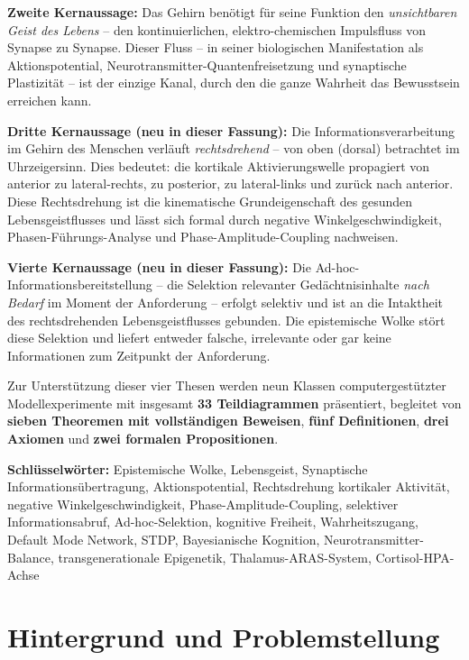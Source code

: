 ﻿\documentclass[12pt,a4paper]{report}
\theoremstyle{plain}
\theoremstyle{definition}
\theoremstyle{remark}
\begin{document}
	\textbf{Zweite Kernaussage:} Das Gehirn benötigt für seine Funktion
	den \emph{unsichtbaren Geist des Lebens} -- den kontinuierlichen, elektro-chemischen
	Impulsfluss von Synapse zu Synapse. Dieser Fluss -- in seiner biologischen
	Manifestation als Aktionspotential, Neurotransmitter-Quantenfreisetzung und
	synaptische Plastizität -- ist der einzige Kanal, durch den die ganze
	Wahrheit das Bewusstsein erreichen kann.
	
	\textbf{Dritte Kernaussage (neu in dieser Fassung):} Die Informationsverarbeitung
	im Gehirn des Menschen verläuft \emph{rechtsdrehend} -- von oben (dorsal)
	betrachtet im Uhrzeigersinn. Dies bedeutet: die kortikale Aktivierungswelle
	propagiert von anterior zu lateral-rechts, zu posterior, zu lateral-links
	und zurück nach anterior. Diese Rechtsdrehung ist die kinematische
	Grundeigenschaft des gesunden Lebensgeistflusses und lässt sich formal
	durch negative Winkelgeschwindigkeit, Phasen-Führungs-Analyse und
	Phase-Amplitude-Coupling nachweisen.
	
	\textbf{Vierte Kernaussage (neu in dieser Fassung):} Die
	Ad-hoc-Informationsbereitstellung -- die Selektion relevanter Gedächtnisinhalte
	\emph{nach Bedarf} im Moment der Anforderung -- erfolgt selektiv und ist
	an die Intaktheit des rechtsdrehenden Lebensgeistflusses gebunden. Die
	epistemische Wolke stört diese Selektion und liefert entweder falsche,
	irrelevante oder gar keine Informationen zum Zeitpunkt der Anforderung.
	
	Zur Unterstützung dieser vier Thesen werden neun Klassen
	computergestützter Modellexperimente mit insgesamt \textbf{33 Teildiagrammen}
	präsentiert, begleitet von \textbf{sieben Theoremen mit vollständigen Beweisen},
	\textbf{fünf Definitionen}, \textbf{drei Axiomen} und
	\textbf{zwei formalen Propositionen}.
	
	\textbf{Schlüsselwörter:}
	Epistemische Wolke, Lebensgeist, Synaptische Informationsübertragung,
	Aktionspotential, Rechtsdrehung kortikaler Aktivität, negative Winkelgeschwindigkeit,
	Phase-Amplitude-Coupling, selektiver Informationsabruf, Ad-hoc-Selektion,
	kognitive Freiheit, Wahrheitszugang, Default Mode Network, STDP,
	Bayesianische Kognition, Neurotransmitter-Balance, transgenerationale Epigenetik,
	Thalamus-ARAS-System, Cortisol-HPA-Achse
	
	\section{Hintergrund und Problemstellung}
	
\end{document}
